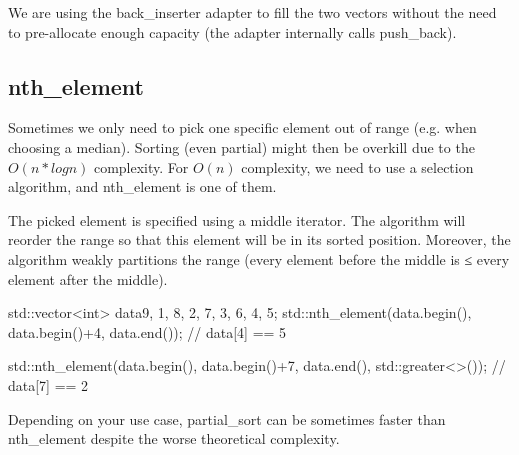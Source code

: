 

\begin{box-note}
\end{box-note}

We are using the back\_inserter adapter to fill the two vectors without the need to pre-allocate enough capacity (the adapter internally calls push\_back).

\subsection{nth\_element}

Sometimes we only need to pick one specific element out of range (e.g. when choosing a median). Sorting (even partial) might then be overkill due to the $O(n*logn)$ complexity. For $O(n)$ complexity, we need to use a selection algorithm, and nth\_element is one of them.



The picked element is specified using a middle iterator. The algorithm will reorder the range so that this element will be in its sorted position. Moreover, the algorithm weakly partitions the range (every element before the middle is ≤ every element after the middle).

\begin{box-note}
\begin{cppcode}
std::vector<int> data{9, 1, 8, 2, 7, 3, 6, 4, 5};
std::nth_element(data.begin(), data.begin()+4, data.end());
// data[4] == 5

std::nth_element(data.begin(), data.begin()+7, data.end(), std::greater<>());
// data[7] == 2
\end{cppcode}
\end{box-note}

Depending on your use case, partial\_sort can be sometimes faster than nth\_element despite the worse theoretical complexity.